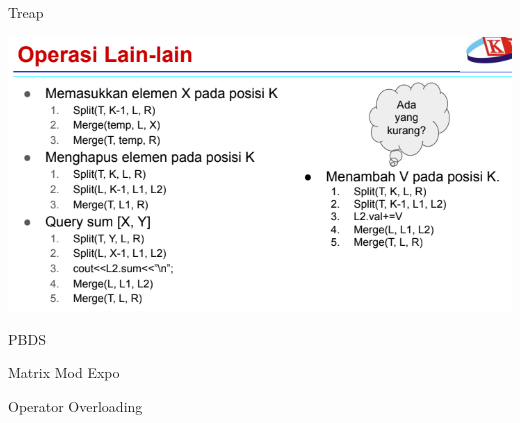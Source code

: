 \documentclass{article}
\newcommand{\mytitle}[1]{
    \begin{center}
        {\LARGE #1} \\[0.5cm]
    \end{center}
}
\begin{document}
\mytitle{Treap}



\includegraphics[width=0.8\linewidth]{../data-structures/treap-operations.png}

\pagebreak

\mytitle{PBDS}



\pagebreak

\mytitle{Matrix Mod Expo}



\pagebreak

\mytitle{Operator Overloading}



\pagebreak
\end{document}
